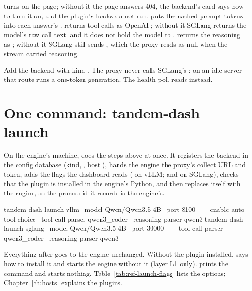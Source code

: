  turns on the  page; without it the page answers 404, the backend's card says how to turn it on, and the plugin's hooks do not run.  puts the cached prompt tokens into each answer's .  returns tool calls as OpenAI ; without it SGLang returns the model's raw call text, and it does not hold the model to .  returns the reasoning as ; without it SGLang still sends , which the proxy reads as null when the stream carried reasoning.

Add the backend with kind . The proxy never calls SGLang's : on an idle server that route runs a one-token generation. The health poll reads  instead.

\section{One command: tandem-dash launch}\label{sec:launch}

On the engine's machine,  does the steps above at once. It registers the backend in the config database (kind, , host ), hands the engine the proxy's collect URL and token, adds the flags the dashboard reads ( on vLLM;  and  on SGLang), checks that the plugin is installed in the engine's Python, and then replaces itself with the engine, so the process id it records is the engine's.

\begin{shell}
tandem-dash launch vllm --model Qwen/Qwen3.5-4B --port 8100 -- \
    --enable-auto-tool-choice --tool-call-parser qwen3_coder --reasoning-parser qwen3
tandem-dash launch sglang --model Qwen/Qwen3.5-4B --port 30000 -- \
    --tool-call-parser qwen3_coder --reasoning-parser qwen3
\end{shell}

Everything after \code{--} goes to the engine unchanged. Without the plugin installed,  says how to install it and starts the engine without it (layer L1 only).  prints the command and starts nothing. Table~\ref{tab:ref-launch-flags} lists the options; Chapter~\ref{ch:hosts} explains the plugins.

